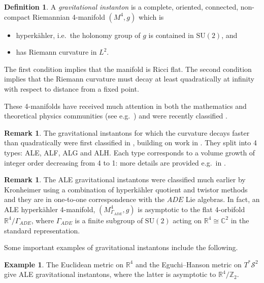 \documentclass{article}
\theoremstyle{definition}
\newtheorem{dfn}[thm]{Definition}
\newtheorem{rmk}[thm]{Remark}
\newtheorem{eg}[thm]{Example}
\numberwithin{thm}{section}
\numberwithin{equation}{section}
\def\R{\mathbb{R}}
\begin{document}
\begin{dfn}
    A \emph{gravitational instanton} is a complete, oriented, connected, non-compact Riemannian 4-manifold $(M^4,g)$ which is
    \begin{itemize}
        \item hyperk\"ahler, i.e.~the holonomy group of $g$ is contained in $\mathrm{SU}(2)$, and 
        \item has Riemann curvature in $L^2$.
    \end{itemize}
The first condition implies that the manifold is Ricci flat. The second condition implies that the Riemann curvature must decay at least quadratically at infinity with respect to distance from a fixed point.  
\end{dfn}

These 4-manifolds have received much attention in both the mathematics and theoretical physics communities (see e.g.~\cite{AcharyaJoyce,Barbosa,GibbonsHawking,Kronheimer,Minerbe2011}) and were recently classified \cite{SunZhang}.


\begin{rmk}\label{rmk:ALE-H}
The gravitational instantons for which the curvature decays faster than quadratically were first classified in \cite{Chens2,Chens1,Chens3}, building on work in  
\cite{Minerbe2010}.  
They split into 4 types: ALE, ALF, ALG and ALH. Each type corresponds to a volume growth of integer order decreasing from 4 to 1: more details are provided e.g.~in \cite{SunZhang}. 
\end{rmk}

\begin{rmk}\label{rmk:ALE}
    The ALE gravitational instantons were classified much earlier by Kronheimer \cite{Kronheimer} using a combination of hyperk\"ahler quotient and twistor methods and they are in one-to-one correspondence with the $ADE$ Lie algebras. In fact, an ALE hyperk\"ahler 4-manifold, $(M^4_{\Gamma_{ADE}}, g)$ is asymptotic to the flat 4-orbifold $\mathbb{R}^4/\Gamma_{ADE}$, where $\Gamma_{ADE}$ is a finite subgroup of $\mathrm{SU}(2)$ acting on $\mathbb{R}^4 \cong \mathbb{C}^2$ in the standard representation.
\end{rmk}


Some important examples of gravitational instantons include the following.
\begin{eg} The Euclidean metric on $\R^4$ and the Eguchi--Hanson metric on $T^*\mathcal{S}^2$ give ALE gravitational instantons, where the latter is asymptotic to $\R^4/\mathbb{Z}_2$.
\end{eg}
\end{document}
